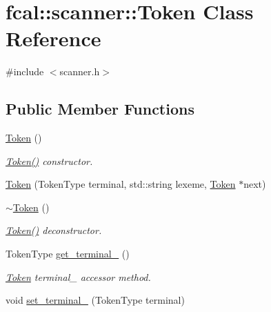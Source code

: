 \hypertarget{classfcal_1_1scanner_1_1Token}{}\section{fcal\+:\+:scanner\+:\+:Token Class Reference}
\label{classfcal_1_1scanner_1_1Token}


{\ttfamily \#include $<$scanner.\+h$>$}

\subsection*{Public Member Functions}
\begin{DoxyCompactItemize}
\item 
\hyperlink{classfcal_1_1scanner_1_1Token_a7c1dcd4c5a9c6ea04470ab2da0b7e4d3}{Token} ()\hypertarget{classfcal_1_1scanner_1_1Token_a7c1dcd4c5a9c6ea04470ab2da0b7e4d3}{}\label{classfcal_1_1scanner_1_1Token_a7c1dcd4c5a9c6ea04470ab2da0b7e4d3}

\begin{DoxyCompactList}\small\item\em \hyperlink{classfcal_1_1scanner_1_1Token_a7c1dcd4c5a9c6ea04470ab2da0b7e4d3}{Token()} constructor. \end{DoxyCompactList}\item 
\hyperlink{classfcal_1_1scanner_1_1Token_a185c60506f8a059cac4ef1df9e2ed38a}{Token} (Token\+Type terminal, std\+::string lexeme, \hyperlink{classfcal_1_1scanner_1_1Token}{Token} $\ast$next)
\item 
\hyperlink{classfcal_1_1scanner_1_1Token_a6979a10e31af36531d793584215ea86f}{$\sim$\+Token} ()\hypertarget{classfcal_1_1scanner_1_1Token_a6979a10e31af36531d793584215ea86f}{}\label{classfcal_1_1scanner_1_1Token_a6979a10e31af36531d793584215ea86f}

\begin{DoxyCompactList}\small\item\em \hyperlink{classfcal_1_1scanner_1_1Token_a7c1dcd4c5a9c6ea04470ab2da0b7e4d3}{Token()} deconstructor. \end{DoxyCompactList}\item 
Token\+Type \hyperlink{classfcal_1_1scanner_1_1Token_a85ab32e4c9f749421c7ef3fd54fb38cb}{get\+\_\+terminal\+\_\+} ()\hypertarget{classfcal_1_1scanner_1_1Token_a85ab32e4c9f749421c7ef3fd54fb38cb}{}\label{classfcal_1_1scanner_1_1Token_a85ab32e4c9f749421c7ef3fd54fb38cb}

\begin{DoxyCompactList}\small\item\em \hyperlink{classfcal_1_1scanner_1_1Token}{Token} terminal\+\_\+ accessor method. \end{DoxyCompactList}\item 
void \hyperlink{classfcal_1_1scanner_1_1Token_ac5bba76cadcc40f134d23b823b23e320}{set\+\_\+terminal\+\_\+} (Token\+Type terminal)\hypertarget{classfcal_1_1scanner_1_1Token_ac5bba76cadcc40f134d23b823b23e320}{}\label{classfcal_1_1scanner_1_1Token_ac5bba76cadcc40f134d23b823b23e320}


\end{DoxyCompactItemize}
